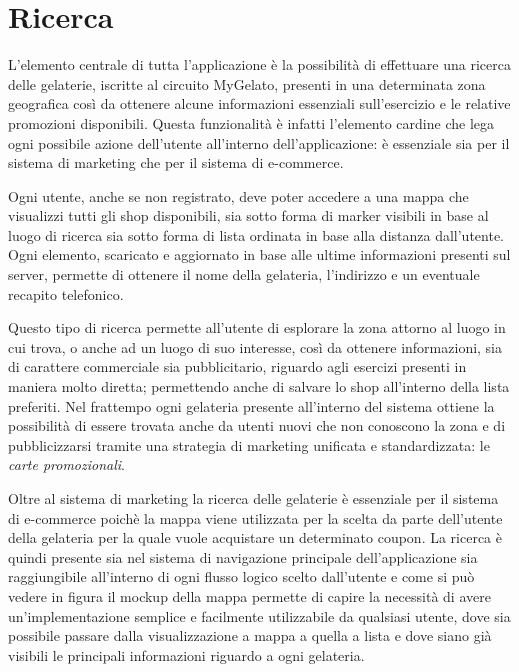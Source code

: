\section{Ricerca}

L'elemento centrale di tutta l'applicazione è la possibilità di effettuare
una ricerca delle gelaterie, iscritte al circuito MyGelato, presenti
in una determinata zona geografica così da ottenere alcune informazioni
essenziali sull'esercizio e le relative promozioni disponibili. Questa
funzionalità è infatti l'elemento cardine che lega ogni possibile
azione dell'utente all'interno dell'applicazione: è essenziale sia
per il sistema di marketing che per il sistema di e-commerce.\bigskip{}

Ogni utente, anche se non registrato, deve poter accedere a una mappa
che visualizzi tutti gli shop disponibili, sia sotto forma di marker
visibili in base al luogo di ricerca sia sotto forma di lista ordinata
in base alla distanza dall'utente. Ogni elemento, scaricato e aggiornato
in base alle ultime informazioni presenti sul server, permette di
ottenere il nome della gelateria, l'indirizzo e un eventuale recapito
telefonico.

Questo tipo di ricerca permette all'utente di esplorare la zona attorno
al luogo in cui trova, o anche ad un luogo di suo interesse, così
da ottenere informazioni, sia di carattere commerciale sia pubblicitario,
riguardo agli esercizi presenti in maniera molto diretta; permettendo
anche di salvare lo shop all'interno della lista preferiti. Nel frattempo
ogni gelateria presente all'interno del sistema ottiene la possibilità
di essere trovata anche da utenti nuovi che non conoscono la zona
e di pubblicizzarsi tramite una strategia di marketing unificata e
standardizzata: le \emph{carte promozionali}.\bigskip{}

Oltre al sistema di marketing la ricerca delle gelaterie è essenziale
per il sistema di e-commerce poichè la mappa viene utilizzata per
la scelta da parte dell'utente della gelateria per la quale vuole
acquistare un determinato coupon. La ricerca è quindi presente sia
nel sistema di navigazione principale dell'applicazione sia raggiungibile
all'interno di ogni flusso logico scelto dall'utente e come si può
vedere in figura il mockup della mappa permette di capire la necessità
di avere un'implementazione semplice e facilmente utilizzabile da
qualsiasi utente, dove sia possibile passare dalla visualizzazione
a mappa a quella a lista e dove siano già visibili le principali informazioni
riguardo a ogni gelateria.

